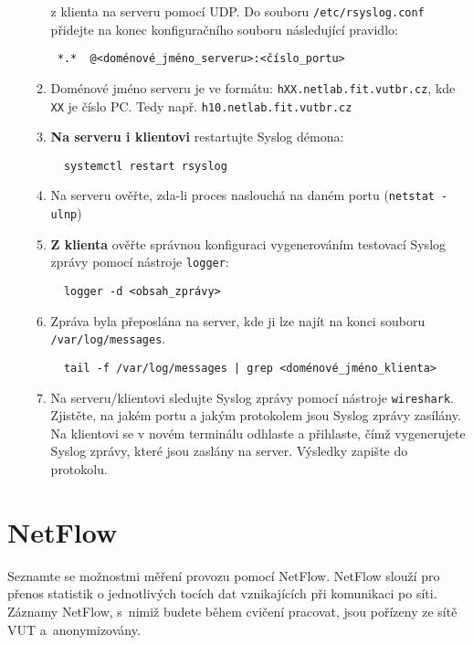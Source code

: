 \begin{itemize}
\begin{enumerate}
         z klienta na serveru pomocí UDP.
         Do souboru {\tt /etc/rsyslog.conf} přidejte na konec konfiguračního souboru následující pravidlo:
\begin{verbatim} 
 *.*  @<doménové_jméno_serveru>:<číslo_portu>
\end{verbatim}
            \item Doménové jméno serveru je ve formátu: \texttt{hXX.netlab.fit.vutbr.cz}, kde \texttt{XX} je číslo PC. Tedy např. \texttt{h10.netlab.fit.vutbr.cz}
            \item {\bf Na serveru i klientovi} restartujte Syslog démona: 
\begin{verbatim}
  systemctl restart rsyslog
\end{verbatim} 
            \item Na serveru ověřte, zda-li proces naslouchá na daném portu (\verb|netstat -ulnp|) 
            \item {\bf Z klienta} ověřte správnou konfiguraci vygenerováním testovací Syslog zprávy pomocí nástroje {\tt logger}:
            
\begin{verbatim} 
  logger -d <obsah_zprávy>
\end{verbatim} 

            \item Zpráva byla přeposlána na server, kde ji lze najít na konci souboru
         {\tt /var/log/messages}.

\begin{verbatim} 
  tail -f /var/log/messages | grep <doménové_jméno_klienta>
\end{verbatim} 

            \item Na serveru/klientovi sledujte Syslog zprávy pomocí nástroje {\tt wireshark}. Zjistěte, na jakém portu a jakým protokolem jsou Syslog zprávy zasílány. Na klientovi se v novém terminálu odhlaste a přihlaste, čímž vygenerujete Syslog zprávy, které jsou zaslány na server. Výsledky zapište do protokolu.
       \end{enumerate}
   \end{itemize}

\section{NetFlow}

Seznamte se možnostmi měření provozu pomocí NetFlow. NetFlow slouží pro
přenos statistik o jednotlivých tocích dat vznikajících při komunikaci po síti. Záznamy NetFlow, s~nimiž budete během cvičení pracovat, jsou
pořízeny ze sítě VUT a~anonymizovány.

